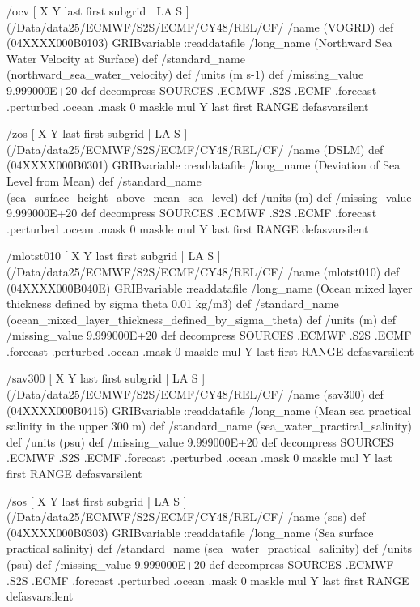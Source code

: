\begin{ingrid}
/ocv { [ X Y last first subgrid | LA S ] (/Data/data25/ECMWF/S2S/ECMF/CY48/REL/CF/%
/name (VOGRD) def
(04XXXX000B0103) GRIBvariable
:readdatafile
/long_name (Northward Sea Water Velocity at Surface) def
/standard_name (northward_sea_water_velocity) def
/units (m s-1) def
/missing_value 9.999000E+20 def
decompress
  SOURCES .ECMWF .S2S .ECMF .forecast .perturbed .ocean .mask
   0 maskle
   mul
Y last first RANGE
} defasvarsilent

/zos { [ X Y last first subgrid | LA S ] (/Data/data25/ECMWF/S2S/ECMF/CY48/REL/CF/%
/name (DSLM) def
(04XXXX000B0301) GRIBvariable
:readdatafile
/long_name (Deviation of Sea Level from Mean) def
/standard_name (sea_surface_height_above_mean_sea_level) def
/units (m) def
/missing_value 9.999000E+20 def
decompress
  SOURCES .ECMWF .S2S .ECMF .forecast .perturbed .ocean .mask
   0 maskle
   mul
Y last first RANGE
} defasvarsilent


/mlotst010 { [ X Y last first subgrid | LA S ] (/Data/data25/ECMWF/S2S/ECMF/CY48/REL/CF/%
/name (mlotst010) def
(04XXXX000B040E) GRIBvariable
:readdatafile
/long_name (Ocean mixed layer thickness defined by sigma theta 0.01 kg/m3) def
/standard_name (ocean_mixed_layer_thickness_defined_by_sigma_theta) def
/units (m) def
/missing_value 9.999000E+20 def
decompress
  SOURCES .ECMWF .S2S .ECMF .forecast .perturbed .ocean .mask
   0 maskle
   mul
Y last first RANGE
} defasvarsilent

/sav300 { [ X Y last first subgrid | LA S ] (/Data/data25/ECMWF/S2S/ECMF/CY48/REL/CF/%
/name (sav300) def
(04XXXX000B0415) GRIBvariable
:readdatafile
/long_name (Mean sea practical salinity in the upper 300 m) def
/standard_name (sea_water_practical_salinity) def
/units (psu) def
/missing_value 9.999000E+20 def
decompress
  SOURCES .ECMWF .S2S .ECMF .forecast .perturbed .ocean .mask
   0 maskle
   mul
Y last first RANGE
} defasvarsilent

/sos { [ X Y last first subgrid | LA S ] (/Data/data25/ECMWF/S2S/ECMF/CY48/REL/CF/%
/name (sos) def
(04XXXX000B0303) GRIBvariable
:readdatafile
/long_name (Sea surface practical salinity) def
/standard_name (sea_water_practical_salinity) def
/units (psu) def
/missing_value 9.999000E+20 def
decompress
  SOURCES .ECMWF .S2S .ECMF .forecast .perturbed .ocean .mask
   0 maskle
   mul
Y last first RANGE
} defasvarsilent



\end{ingrid}
